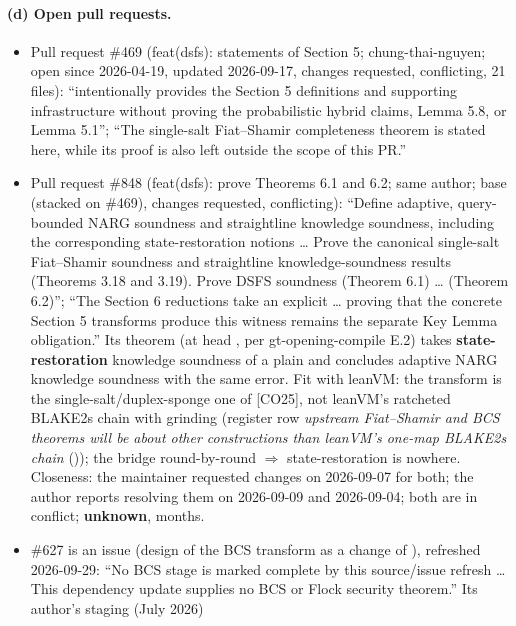 \paragraph{(d) Open pull requests.}
\begin{itemize}
\item Pull request \#469 (feat(dsfs): statements of Section 5; chung-thai-nguyen; open since
  2026-04-19, updated 2026-09-17, changes requested, conflicting, 21 files): ``intentionally
  provides the Section 5 definitions and supporting infrastructure without proving the
  probabilistic hybrid claims, Lemma 5.8, or Lemma 5.1''; ``The single-salt Fiat--Shamir
  completeness theorem is stated here, while its proof is also left outside the scope of this
  PR.''
\item Pull request \#848 (feat(dsfs): prove Theorems 6.1 and 6.2; same author; base
   (stacked on \#469), changes requested, conflicting): ``Define adaptive,
  query-bounded NARG soundness and straightline knowledge soundness, including the corresponding
  state-restoration notions \ldots{} Prove the canonical single-salt Fiat--Shamir soundness and
  straightline knowledge-soundness results (Theorems 3.18 and 3.19). Prove DSFS soundness
  (Theorem 6.1) \ldots{} (Theorem 6.2)''; ``The Section 6 reductions take an explicit
   \ldots{} proving that the concrete Section 5 transforms produce
  this witness remains the separate Key Lemma obligation.'' Its  theorem
   (at head , per
  gt-opening-compile E.2) takes \textbf{state-restoration} knowledge soundness of a plain
   and concludes adaptive NARG knowledge soundness with the same error. Fit with
  leanVM: the transform is the single-salt/duplex-sponge one of [CO25], not leanVM's ratcheted
  BLAKE2s chain with grinding (register row \emph{upstream Fiat--Shamir and BCS theorems will be
  about other constructions than leanVM's one-map BLAKE2s chain} ()); the bridge
  round-by-round $\Rightarrow$ state-restoration is nowhere. Closeness: the maintainer requested
  changes on 2026-09-07 for both; the author reports resolving them on 2026-09-09 and 2026-09-04;
  both are in conflict; \textbf{unknown}, months.
\item \#627 is an issue (design of the BCS transform as a change of ), refreshed
  2026-09-29: ``No BCS stage is marked complete by this source/issue refresh \ldots{} This
  dependency update supplies no BCS or Flock security theorem.'' Its author's staging (July 2026)

\end{itemize}
